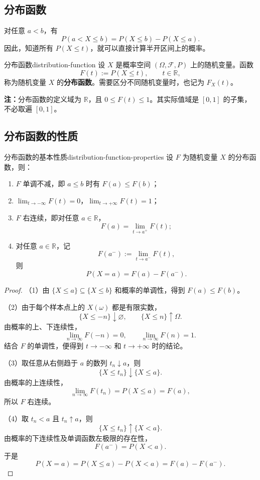 \subsection*{分布函数}

对任意 $a<b$，有
\[
P(a<X\leq b)=P(X\leq b)-P(X\leq a).
\]
因此，知道所有 $P(X\leq t)$，就可以直接计算半开区间上的概率。

\begin{mydefinition}{分布函数}{distribution-function}
设 $X$ 是概率空间 $(\Omega,\mathscr F,P)$ 上的随机变量。函数
\[
F(t):=P(X\leq t),\qquad t\in\mathbb R,
\]
称为随机变量 $X$ 的\textbf{分布函数}。需要区分不同随机变量时，也记为 $F_X(t)$。
\end{mydefinition}

\textbf{注：}\quad 分布函数的定义域为 $\mathbb R$，且 $0\leq F(t)\leq1$。其实际值域是 $[0,1]$ 的子集，不必取遍 $[0,1]$。

\subsection*{分布函数的性质}

\begin{mytheorem}{分布函数的基本性质}{distribution-function-properties}
设 $F$ 为随机变量 $X$ 的分布函数，则：
\begin{enumerate}
    \item $F$ 单调不减，即 $a\leq b$ 时有 $F(a)\leq F(b)$；
    \item $\displaystyle\lim_{t\to-\infty}F(t)=0$，$\displaystyle\lim_{t\to+\infty}F(t)=1$；
    \item $F$ 右连续，即对任意 $a\in\mathbb R$，
    \[
    F(a)=\lim_{t\to a^+}F(t);
    \]
    \item 对任意 $a\in\mathbb R$，记
    \[
    F(a^-):=\lim_{t\to a^-}F(t),
    \]
    则
    \[
    P(X=a)=F(a)-F(a^-).
    \]
\end{enumerate}
\end{mytheorem}

\begin{proof}
（1）由 $\{X\leq a\}\subseteq\{X\leq b\}$ 和概率的单调性，得到 $F(a)\leq F(b)$。

（2）由于每个样本点上的 $X(\omega)$ 都是有限实数，
\[
\{X\leq-n\}\downarrow\varnothing,
\qquad
\{X\leq n\}\uparrow\Omega.
\]
由概率的上、下连续性，
\[
\lim_{n\to\infty}F(-n)=0,
\qquad
\lim_{n\to\infty}F(n)=1.
\]
结合 $F$ 的单调性，便得到 $t\to-\infty$ 和 $t\to+\infty$ 时的结论。

（3）取任意从右侧趋于 $a$ 的数列 $t_n\downarrow a$，则
\[
\{X\leq t_n\}\downarrow\{X\leq a\}.
\]
由概率的上连续性，
\[
\lim_{n\to\infty}F(t_n)=P(X\leq a)=F(a),
\]
所以 $F$ 右连续。

（4）取 $t_n<a$ 且 $t_n\uparrow a$，则
\[
\{X\leq t_n\}\uparrow\{X<a\}.
\]
由概率的下连续性及单调函数左极限的存在性，
\[
F(a^-)=P(X<a).
\]
于是
\[
P(X=a)=P(X\leq a)-P(X<a)=F(a)-F(a^-).
\]
\end{proof}

